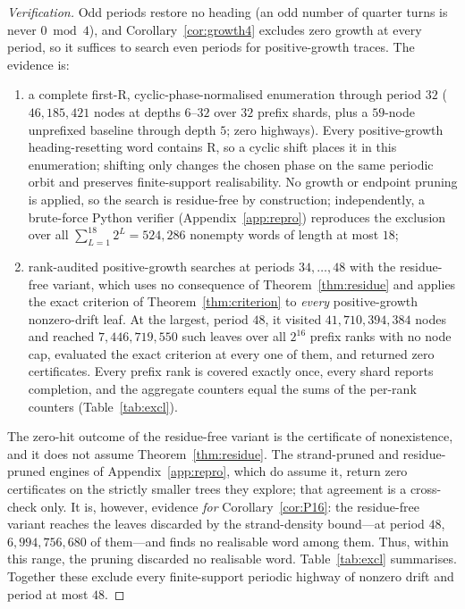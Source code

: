 \documentclass[11pt,letterpaper]{article}
\theoremstyle{plain}
\theoremstyle{definition}
\newcommand{\turnR}{\mathrm{R}}
\begin{document}
\begin{NoHyper}
\begin{proof}[Verification]
Odd periods restore no heading (an odd number of quarter turns is never
$0\bmod4$), and Corollary~\ref{cor:growth4} excludes zero growth at every period, so
it suffices to search even periods for positive-growth traces. The evidence is:
\begin{enumerate}[label=\textup{(\alph*)}]
\item a complete first-$\turnR$, cyclic-phase-normalised enumeration through
period $32$ ($46{,}185{,}421$ nodes at depths $6$--$32$ over $32$ prefix shards,
plus a $59$-node unprefixed baseline through depth $5$; zero highways). Every
positive-growth heading-resetting word contains $\turnR$, so a cyclic shift places
it in this enumeration; shifting only changes the chosen phase on the same periodic
orbit and preserves finite-support realisability. No growth or endpoint pruning is
applied, so the search is residue-free by construction;
independently, a brute-force Python verifier (Appendix~\ref{app:repro}) reproduces the
exclusion over all $\sum_{L=1}^{18}2^L=524{,}286$ nonempty words of length at most $18$;
\item rank-audited positive-growth searches at periods $34,\dots,48$ with the
residue-free variant, which uses no consequence of Theorem~\ref{thm:residue} and applies
the exact criterion of Theorem~\ref{thm:criterion} to \emph{every} positive-growth
nonzero-drift leaf. At the largest, period $48$, it visited $41{,}710{,}394{,}384$
nodes and reached $7{,}446{,}719{,}550$ such leaves over all $2^{16}$ prefix ranks with
no node cap, evaluated the exact criterion at every one of them, and returned zero
certificates. Every prefix rank is covered exactly once, every shard reports
completion, and the aggregate counters equal the sums of the per-rank counters
(Table~\ref{tab:excl}).
\end{enumerate}
The zero-hit outcome of the residue-free variant is the certificate of nonexistence, and
it does not assume Theorem~\ref{thm:residue}. The strand-pruned and residue-pruned
engines of Appendix~\ref{app:repro}, which do assume it, return zero certificates on
the strictly smaller trees they explore; that agreement is a cross-check only. It is,
however, evidence \emph{for} Corollary~\ref{cor:P16}: the residue-free variant reaches
the leaves discarded by the strand-density bound---at period $48$,
$6{,}994{,}756{,}680$ of them---and finds no realisable word among them.
Thus, within this range, the pruning discarded no realisable word.
Table~\ref{tab:excl} summarises. Together these exclude every finite-support periodic
highway of nonzero drift and period at most $48$.
\end{proof}


\end{NoHyper}
\end{document}
